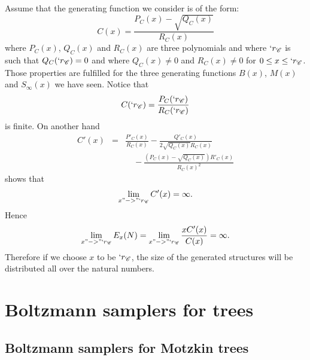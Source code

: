 \documentclass{sig-alternate}
\newcommand{\C}{\mathscr{C}}
\begin{document}
Assume that the generating function we consider is of the form:
\begin{displaymath}
  C(x) = \frac{P_C(x) - \sqrt{Q_C(x)}}{R_C(x)}
\end{displaymath}
where $P_C(x)$, $Q_C(x)$ and $R_C(x)$ are three polynomials and where $`r_\C$ is such that
$Q_C(`r_\C) = 0$ and where $Q_C(x)\neq 0$ and $R_C(x) \neq 0$ for $0\le x\le `r_\C$.  Those properties are
fulfilled for the three generating functions $B(x)$, $M(x)$ and $S_\infty(x)$ we have
seen.  Notice that 
\begin{displaymath}
  C(`r_\C) = \frac{P_C(`r_\C)}{R_C(`r_\C)}
\end{displaymath}
is finite. On another hand
\begin{eqnarray*}
  C'(x) &=& \frac{P'_C(x)}{R_C(x)} - \frac{Q'_C(x)}{2\sqrt{Q_C(x)}R_C(x)} \\
  && \quad - \frac{(P_C(x) - \sqrt{Q_C(x)}) R'_C(x)}{R_C(x)^2}
\end{eqnarray*}
shows that
\begin{displaymath}
  \lim_{x"->"`r_\C} C'(x) = \infty.
\end{displaymath}
Hence 
\begin{displaymath}
  \lim_{x"->"`r_\C} E_x(N) = \lim_{x"->"`r_\C} \frac{x C'(x)}{C(x)} = \infty.
\end{displaymath}
Therefore if we choose $x$ to be  $`r_\C$, the size of the generated structures will
be distributed all over the natural numbers.

\section{Boltzmann samplers for trees}
\label{sec:BoltzmannTree}

\subsection{Boltzmann samplers for Motzkin trees}
\label{sec:Bol-Mot}
\end{document}
